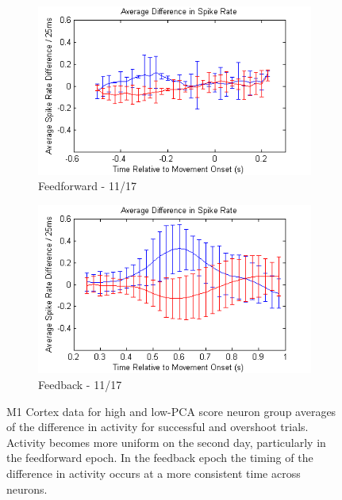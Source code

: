 \documentclass[11pt,a4paper]{article}
\begin{document}
\begin{figure}[h]
{\begin{subfigure}[b]{0.75\textwidth}
                \centering
                \includegraphics[width=\textwidth]{diffs-pre-m1-17}
                \caption{\large Feedforward - 11/17 \\}
                \label{fig:diffs-pre-m1-17}
        \end{subfigure}
        \begin{subfigure}[b]{0.75\textwidth}
                \centering
                \includegraphics[width=\textwidth]{diffs-pos-m1-17}
                \caption{\large Feedback - 11/17 \\}
                \label{fig:diffs-pos-m1-17}
        \end{subfigure}}
        \caption{M1 Cortex data for high and low-PCA score neuron group averages of the difference in activity for successful and overshoot trials. Activity becomes more uniform on the second day, particularly in the feedforward epoch. In the feedback epoch the timing of the difference in activity occurs at a more consistent time across neurons.}\label{fig:diffs-m1}
\end{figure}
\end{document}
